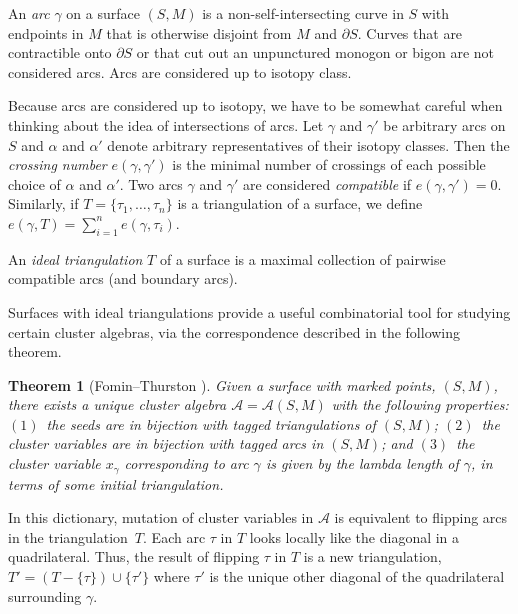 \documentclass[11pt]{article}
\numberwithin{equation}{section}
\newtheorem{Theorem}{Theorem}[section]
\begin{document}
\begin{Definition}An \emph{arc} $\gamma$ on a surface $(S,M)$ is a non-self-intersecting curve in $S$ with endpoints in $M$ that is otherwise disjoint from $M$ and $\partial S$. Curves that are contractible onto $\partial S$ or that cut out an unpunctured monogon or bigon are not considered arcs. Arcs are considered up to isotopy class.
\end{Definition}

Because arcs are considered up to isotopy, we have to be somewhat careful when thinking about the idea of intersections of arcs. Let $\gamma$ and $\gamma'$ be arbitrary arcs on $S$ and $\alpha$ and $\alpha'$ denote arbitrary representatives of their isotopy classes. Then the \emph{crossing number} $e(\gamma,\gamma')$ is the minimal number of crossings of each possible choice of $\alpha$ and $\alpha'$. Two arcs $\gamma$ and $\gamma'$ are considered \emph{compatible} if $e(\gamma,\gamma') = 0.$ Similarly, if $T = \{\tau_1,\ldots,\tau_n\}$ is a triangulation of a surface, we define $e(\gamma,T) = \sum_{i=1}^n e(\gamma, \tau_i)$.

\begin{Definition}
An \emph{ideal triangulation} $T$ of a surface is a maximal collection of pairwise compatible arcs (and boundary arcs).
\end{Definition}

Surfaces with ideal triangulations provide a useful combinatorial tool for studying certain cluster algebras, via the correspondence described in the following theorem.

\begin{Theorem}[Fomin--Thurston \cite{FT-II}]\label{SurfaceCA}
Given a surface with marked points, $(S,M)$, there exists a unique cluster algebra $\mathcal{A} = \mathcal{A}(S,M)$ with the following properties: $(1)$~the seeds are in bijection with tagged triangulations of $(S,M)$;
$(2)$~the cluster variables are in bijection with tagged arcs in $(S,M)$; and $(3)$~the cluster variable $x_\gamma$ corresponding to arc $\gamma$ is given by the lambda length of $\gamma$, in terms of some initial triangulation.
\end{Theorem}
 In this dictionary, mutation of cluster variables in $\mathcal{A}$ is equivalent to flipping arcs in the triangulation~$T$. Each arc $\tau$ in $T$ looks locally like the diagonal in a quadrilateral. Thus, the result of flipping $\tau$ in $T$ is a new triangulation, $T' = (T - \{\tau\}) \cup \{\tau' \}$ where $\tau'$ is the unique other diagonal of the quadrilateral surrounding $\gamma$.
\end{document}
